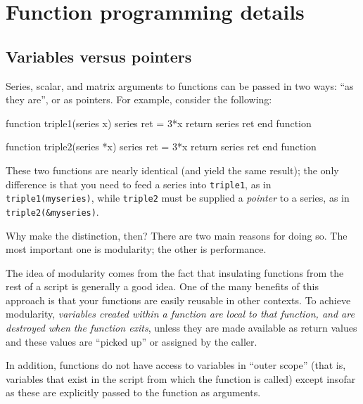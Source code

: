 \section{Function programming details}
\label{func-details}

\subsection{Variables versus pointers}
\label{funscope}

Series, scalar, and matrix arguments to functions can be passed in two
ways: ``as they are'', or as pointers. For example, consider the
following:
\begin{code}
function triple1(series x)
  series ret = 3*x
  return series ret
end function
  
function triple2(series *x)
  series ret = 3*x
  return series ret
end function
\end{code}

These two functions are nearly identical (and yield the same result);
the only difference is that you need to feed a series into
\texttt{triple1}, as in \texttt{triple1(myseries)}, while
\texttt{triple2} must be supplied a \emph{pointer} to a series, as in
\texttt{triple2(\&myseries)}. 

Why make the distinction, then? There are two main reasons for doing
so. The most important one is modularity; the other is performance.

The idea of modularity comes from the fact that insulating functions
from the rest of a script is generally a good idea.  One of the many
benefits of this approach is that your functions are easily reusable
in other contexts.  To achieve modularity, \emph{variables created
  within a function are local to that function, and are destroyed when
  the function exits}, unless they are made available as return values
and these values are ``picked up'' or assigned by the caller.
    
In addition, functions do not have access to variables in ``outer
scope'' (that is, variables that exist in the script from which the
function is called) except insofar as these are explicitly passed to
the function as arguments.


